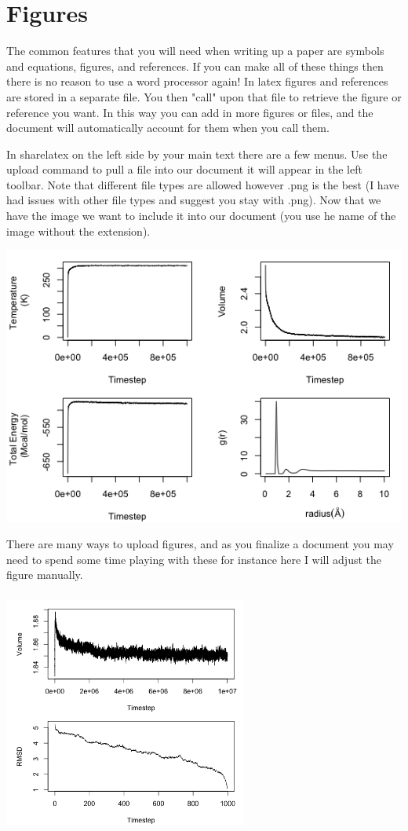 \documentclass{article}
\begin{document}
\section{Figures}
The common features that you will need when writing up a paper are symbols and equations, figures, and references.
If you can make all of these things then there is no reason to use a word processor again!
In latex figures and references are stored in a separate file.
You then "call" upon that file to retrieve the figure or reference you want.
In this way you can add in more figures or files, and the document will automatically account for them when you call them.

In sharelatex on the left side by your main text there are a few menus.
Use the upload command to pull a file into our document it will appear in the left toolbar. 
Note that different file types are allowed however .png is the best (I have had issues with other file types and suggest you stay with .png). 
Now that we have the image we want to include it into our document (you use he name of the image without the extension).
\bigskip

\includegraphics[scale = .5]{equ1_plots}

There are many ways to upload figures, and as you finalize a document you may need to spend some time playing with these for instance here I will adjust the figure manually.

\includegraphics[height=8cm, width=8cm]{equ2_plots}
\end{document}
